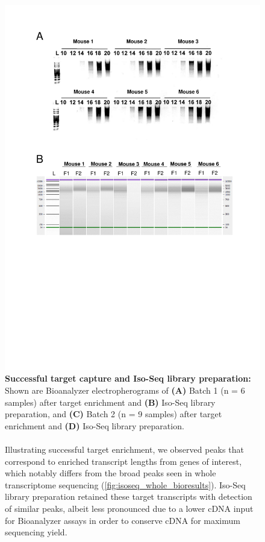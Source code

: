 \begin{figure}[!htp]
	\centering
	\vspace{20pt}
	\includegraphics[page=2,trim={0 17cm 0cm 1cm},clip,scale = 0.75]{Figures/TargetedTranscriptome_LabResults.pdf}
	\captionsetup{width=0.95\textwidth}
	\caption[Iso-Seq Targeted Transcriptome - Target Capture and library preparation]%
	{\textbf{Successful target capture and Iso-Seq library preparation:} Shown are Bioanalyzer electropherograms of \textbf{(A)} Batch 1 (n = 6 samples) after target enrichment and \textbf{(B)} Iso-Seq library preparation, and \textbf{(C)} Batch 2 (n = 9 samples) after target enrichment and \textbf{(D)} Iso-Seq library preparation. 
	\\
	\\
	Illustrating successful target enrichment, we observed peaks that correspond to enriched transcript lengths from genes of interest, which notably differs from the broad peaks seen in whole transcriptome sequencing (\cref{fig:isoseq_whole_bioresults}). Iso-Seq library preparation retained these target transcripts with detection of similar peaks, albeit less pronounced due to a lower cDNA input for Bioanalyzer assays in order to conserve cDNA for maximum sequencing yield.}  
	\label{fig:isoseq_targeted_libresults}
\end{figure}

